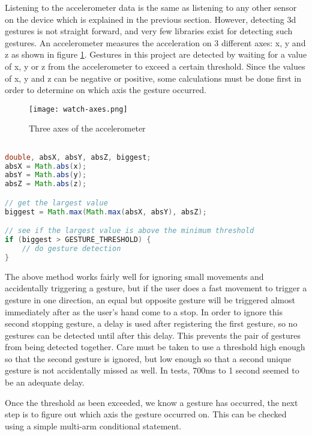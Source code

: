 Listening to the accelerometer data is the same as listening to any other sensor
on the device which is explained in the previous section. However, detecting 3d
gestures is not straight forward, and very few libraries exist for detecting
such gestures. An accelerometer measures the acceleration on 3 different axes: 
x, y and z as shown in figure \ref{fig:accelerometer_axes}. Gestures in this
project are detected by waiting for a value of x, y or z from the accelerometer
to exceed a certain threshold. Since the values of x, y and z can be negative
or positive, some calculations must be done first in order to determine on
which axis the gesture occurred.

\begin{figure}
    \centering
    \texttt{[image: watch-axes.png]}
    \caption{Three axes of the accelerometer}
    \label{fig:accelerometer_axes}
\end{figure}

\begin{lstlisting}[language=Java]

double, absX, absY, absZ, biggest;
absX = Math.abs(x);
absY = Math.abs(y);
absZ = Math.abs(z);

// get the largest value
biggest = Math.max(Math.max(absX, absY), absZ);

// see if the largest value is above the minimum threshold
if (biggest > GESTURE_THRESHOLD) {
    // do gesture detection
}

\end{lstlisting}

The above method works fairly well for ignoring small movements and accidentally
triggering a gesture, but if the user does a fast movement to trigger a gesture
in one direction, an equal but opposite gesture will be triggered almost
immediately after as the user's hand come to a stop. In order to ignore this
second stopping gesture, a delay is used after registering the first gesture, so
no gestures can be detected until after this delay. This prevents the pair of
gestures from being detected together. Care must be taken to use a threshold
high enough so that the second gesture is ignored, but low enough so that a
second unique gesture is not accidentally missed as well. In tests, 700ms to
1 second seemed to be an adequate delay.

Once the threshold as been exceeded, we know a gesture has occurred, the next
step is to figure out which axis the gesture occurred on. This can be checked
using a simple multi-arm conditional statement.

